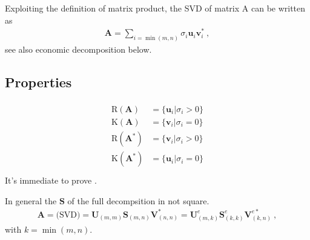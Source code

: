 \documentclass[letterpaper,10pt,english]{jupyterBook}
\begin{document}
\sphinxAtStartPar
Exploiting the definition of matrix product, the SVD of matrix A can be written as
\begin{equation*}
\begin{split}\mathbf{A} = \sum_{i = \min(m,n)} \sigma_i \mathbf{u}_i \mathbf{v}^*_i \ ,\end{split}
\end{equation*}
\sphinxAtStartPar
see also economic decomposition below.


\subsection{Properties}
\label{\detokenize{ch/linear-algebra/svd:properties}}\label{\detokenize{ch/linear-algebra/svd:math-svd-properties}}
\sphinxAtStartPar
{}
\begin{equation*}
\begin{split}\begin{aligned}
  \text{R}(\mathbf{A})   & = \{ \mathbf{u}_i | \sigma_i > 0 \} \\
  \text{K}(\mathbf{A})   & = \{ \mathbf{v}_i | \sigma_i = 0 \} \\
  \text{R}(\mathbf{A}^*) & = \{ \mathbf{v}_i | \sigma_i > 0 \} \\
  \text{K}(\mathbf{A}^*) & = \{ \mathbf{u}_i | \sigma_i = 0\} \\
\end{aligned}\end{split}
\end{equation*}
\sphinxAtStartPar
It’s immediate to prove {\hyperref[\detokenize{ch/linear-algebra/matrices:math-linear-algebra-thms-raperpkah}]{}}.

\sphinxAtStartPar
{} In general the \(\mathbf{S}\) of the full decompsition in not square.
\begin{equation*}
\begin{split}\mathbf{A} = \text{(SVD)} = \mathbf{U}_{(m,m)} \mathbf{S}_{(m,n)} \mathbf{V}^*_{(n,n)} = \mathbf{U}^e_{(m,k)} \mathbf{S}^e_{(k,k)} \mathbf{V}^{e *}_{(k,n)} \ ,\end{split}
\end{equation*}
\sphinxAtStartPar
with \(k = \min(m,n)\).
\end{document}
